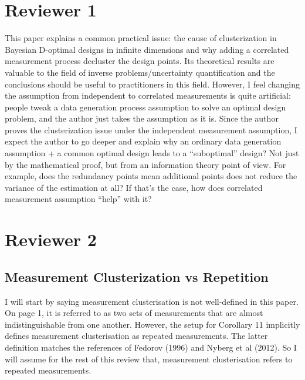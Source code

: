 \documentclass{amsart}
\begin{document}
\section{Reviewer 1}
This paper explains a common practical issue: the cause of
clusterization in Bayesian D-optimal designs in infinite dimensions
and why adding a correlated measurement process decluster the design
points. Its theoretical results are valuable to the field of inverse
problems/uncertainty quantification and the conclusions should be
useful to practitioners in this field.  However, I feel changing the
assumption from independent to correlated measurements is quite
artificial: people tweak a data generation process assumption to solve
an optimal design problem, and the author just takes the assumption as
it is. Since the author proves the clusterization issue under the
independent measurement assumption, I expect the author to go deeper
and explain why an ordinary data generation assumption + a common
optimal design leads to a “suboptimal” design? Not just by the
mathematical proof, but from an information theory point of view. For
example, does the redundancy points mean additional points does not
reduce the variance of the estimation at all? If that’s the case, how
does correlated measurement assumption “help” with it?


\section{Reviewer 2}
\subsection{Measurement Clusterization vs Repetition}
I will start by saying measurement clusterisation is not well-defined
in this paper. On page 1, it is referred to as two sets of
measurements that are almost indistinguishable from one
another. However, the setup for Corollary 11 implicitly defines
measurement clusterisation as repeated measurements. The latter
definition matches the references of Fedorov (1996) and Nyberg et al
(2012). So I will assume for the rest of this review that, measurement
clusterisation refers to repeated measurements.
\end{document}
